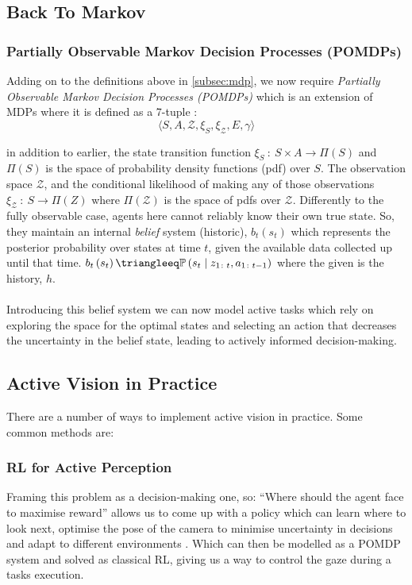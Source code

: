  \subsection{Back To Markov}
  \subsubsection{Partially Observable Markov Decision 
  \label{subsec:pomdp}
  Processes (POMDPs)}
  Adding on to the definitions above in \ref{subsec:mdp}, we now require \emph{Partially Observable Markov Decision Processes (POMDPs)} 
  which is an extension of MDPs where it is defined as a 7-tuple \cite{thrun2002probabilistic,placed2023surveyactivesimultaneouslocalization}: 
  \[\langle S, A, \mathcal{Z}, \xi_S, \xi_{\mathcal{Z}}, E, \gamma \rangle \]
  
  in addition to earlier, the state transition function \( \xi_S ~\colon~ S \times A \rightarrow \Pi\left(S\right)\) and $\Pi\left(S\right)$ is the space of probability density functions (pdf) over $S$. The observation space $\mathcal{Z}$, and the conditional likelihood of making any of those observations \(\xi_{\mathcal{Z}} ~\colon~ S \rightarrow \Pi\left(Z\right)\) where $\Pi\left(\mathcal{Z}\right)$ is the space of pdfs over $\mathcal{Z}$.
  Differently to the fully observable case, agents here cannot reliably know their own true state. So, they maintain an internal \emph{belief} system (historic), $b_t\left(s_t\right)$ which represents the posterior probability over states at time $t$, given the available data collected up until that time. \(b_t\left(s_t\right) \triangleeq  \mathbb{P}\left(s_t \mid z_{1 \colon t}, a_{1 \colon t - 1}\right)\) where the given is the history, $h$.
  \\\\
  Introducing this belief system we can now model active tasks which rely on exploring the space for the optimal states and selecting an action that decreases the uncertainty in the belief state, leading to actively informed decision-making.


  \subsection{Active Vision in Practice}
  There are a number of ways to implement active vision in practice. Some common methods are:

  \subsubsection{RL for Active Perception}
    Framing this problem as a decision-making one, so: ``Where should the agent face to maximise reward'' allows us to come up with a policy which can learn where to look next, optimise the pose of the camera to minimise uncertainty in decisions and adapt to different environments \cite{rothbucher2011,zhangembodied}. Which can then be modelled as a POMDP system and solved as classical RL, giving us a way to control the gaze during a tasks execution.

